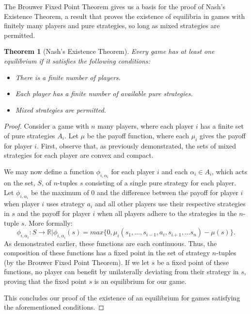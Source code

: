 \documentclass[12pt]{article}
\newtheorem{theorem}{Theorem}[section]
\theoremstyle{definition}
\theoremstyle{remark}
\begin{document}
The Brouwer Fixed Point Theorem gives us a basis for the proof of Nash's Existence Theorem, a result that proves the existence of equilibria in games with finitely many players and pure strategies, so long as mixed strategies are permitted.

\begin{theorem}[Nash's Existence Theorem]
Every game has at least one equilibrium if it satisfies the following conditions:
\begin{itemize}
	\item{There is a finite number of players.}
	\item{Each player has a finite number of available pure strategies.}
	\item{Mixed strategies are permitted.}
\end{itemize}
\end{theorem}

\begin{proof}
Consider a game with $n$ many players, where each player $i$ has a finite set of pure strategies $A_i$. Let $\mu$ be the payoff function, where each $\mu_i$ gives the payoff for player $i$. First, observe that, as previously demonstrated, the sets of mixed strategies for each player are convex and compact.

We may now define a function $\phi_{i,\alpha_i}$ for each player $i$ and each $\alpha_i \in A_i$, which acts on the set, $S$, of $n$-tuples $s$ consisting of a single pure strategy for each player. Let $\phi_{i,\alpha_i}$ be the maximum of 0 and the difference between the payoff for player $i$ when player $i$ uses
strategy $a_i$ and all other players use their respective strategies in $s$ and the payoff for player $i$ when all players adhere to the strategies in the $n$-tuple $s$. More formally:
\[
	\phi_{i,\alpha_i}: S \rightarrow \mathbb{R} | \phi_{i,\alpha_i}(s) = max\{0,\mu_i(s_1 , ... , s_{i-1} , a_i , s_{i+1} , ... s_n) - \mu(s)\}.
\]
As demonstrated earlier, these functions are each continuous. Thus, the composition of these functions has a fixed point in the set of strategy $n$-tuples (by the Brouwer Fixed Point Theorem). If we let $s$ be a fixed point of these functions, no player can benefit by unilaterally deviating from their strategy in $s$, proving
that the fixed point $s$ is an equilibrium for our game.

This concludes our proof of the existence of an equilibrium for games satisfying the aforementioned conditions.
\end{proof}
\end{document}
